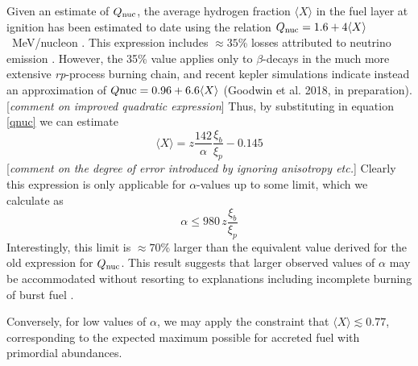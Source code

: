 \documentclass{aastex61}
\begin{document}
Given an estimate of $Q_{\rm nuc}$, the average hydrogen fraction $\langle X\rangle$ in the fuel layer at ignition has been estimated to date using the relation $Q_{\rm nuc}=1.6 + 4\langle X\rangle$~MeV/nucleon \cite[e.g.][and references therein]{gal03d}. This expression includes $\approx35$\% losses
attributed to neutrino emission \cite[]{fuji87}. However, the 35\% value applies only to $\beta$-decays in the much more extensive {\it rp}-process burning chain, and recent {\sc kepler} simulations indicate instead an approximation of $Q{\rm nuc}=0.96+6.6\langle X\rangle$ (Goodwin et al. 2018, in preparation). [{\it comment on improved quadratic expression}]
%
Thus, by substituting in equation \ref{qnuc} we can estimate 
\begin{equation}
\langle X\rangle 
= z\frac{142}{\alpha}\frac{\xi_b}{\xi_p} - 0.145 \label{xbar}
\end{equation}
[{\it comment on the degree of error introduced by ignoring anisotropy etc.}] 
%
Clearly this expression is only applicable for $\alpha$-values up to some limit, which we calculate as
\begin{equation}
\alpha \leq 980\, z \frac{\xi_b}{\xi_p}
\end{equation}
Interestingly, this limit is $\approx70$\% larger than the equivalent value derived for the old expression for $Q_{\rm nuc}$. This result suggests that larger observed values of $\alpha$ may be accommodated without resorting to explanations including incomplete burning of burst fuel \cite[e.g.][]{bcatalog}.

Conversely, for low values of $\alpha$, we may apply the constraint that $\langle X\rangle \lesssim 0.77$, corresponding to the expected maximum possible for accreted fuel with primordial abundances.
\end{document}
